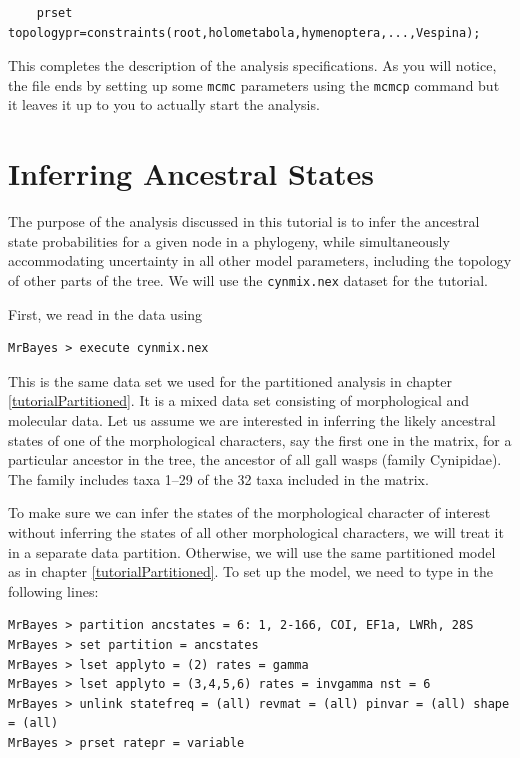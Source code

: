 \documentclass[12pt]{book}
\newcommand{\ttt}[1]{\texttt{#1} }
\begin{document}
\footnotesize
\begin{verbatim}
    prset topologypr=constraints(root,holometabola,hymenoptera,...,Vespina);
\end{verbatim}
\normalsize

This completes the description of the analysis specifications. As you will notice, the file ends by setting up some
\ttt{mcmc} parameters using the \ttt{mcmcp} command but it leaves it up to you to actually start the analysis.

\section{Inferring Ancestral States}

The purpose of the analysis discussed in this tutorial is to infer the ancestral state probabilities for a given node
in a phylogeny, while simultaneously accommodating uncertainty in all other model parameters, including the
topology of other parts of the tree. We will use the \ttt{cynmix.nex} dataset for the tutorial.

First, we read in the data using

\begin{verbatim}
MrBayes > execute cynmix.nex
\end{verbatim}

This is the same data set we used for the partitioned analysis in chapter \ref{tutorialPartitioned}. It is a mixed data set
consisting of morphological and molecular data. Let us assume we are interested in inferring the likely ancestral
states of one of the morphological characters, say the first one in the matrix, for a particular ancestor in the tree, the
ancestor of all gall wasps (family Cynipidae). The family includes taxa 1--29 of the 32 taxa included in the matrix.

To make sure we can infer the states of the morphological character of interest without inferring the states of all
other morphological characters, we will treat it in a separate data partition. Otherwise, we will use the same
partitioned model as in chapter \ref{tutorialPartitioned}. To set up the model, we need to type in the following
lines:

\footnotesize
\begin{singlespacing}
\begin{verbatim}
MrBayes > partition ancstates = 6: 1, 2-166, COI, EF1a, LWRh, 28S
MrBayes > set partition = ancstates
MrBayes > lset applyto = (2) rates = gamma
MrBayes > lset applyto = (3,4,5,6) rates = invgamma nst = 6
MrBayes > unlink statefreq = (all) revmat = (all) pinvar = (all) shape = (all)
MrBayes > prset ratepr = variable
\end{verbatim}
\end{singlespacing}
\normalsize
\end{document}
